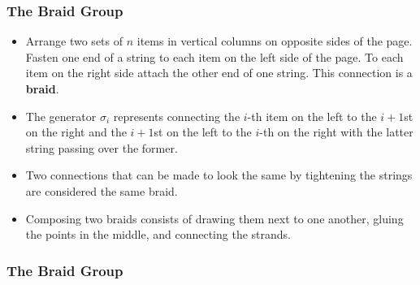 \documentclass{beamer}
\begin{document}
\begin{frame}
	\frametitle{The Braid Group}
	\begin{itemize}
	\item Arrange two sets of $n$ items in vertical columns on opposite sides of the page. Fasten one end of a string to each item on the left side of the page. To each item on the right side attach the other end of one string. This connection is a \textbf{braid}.\pause

	\item The generator $\sigma_i$ represents connecting the $i$-th item on the left to the $i+1$st on the right and the $i+1$st on the left to the $i$-th on the right with the latter string passing over the former.\pause

	\item Two connections that can be made to look the same by tightening the strings are considered the same braid.\pause

	\item Composing two braids consists of drawing them next to one another, gluing the points in the middle, and connecting the strands.
	\end{itemize}
\end{frame}

\begin{frame}
	\frametitle{The Braid Group}
	
\end{frame}
\end{document}
